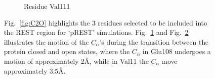 \begin{figure}[!ht]
\begin{subfigure}{.45\textwidth}
   \label{fig:Glu108-C2O}
\end{subfigure}\hfill
\begin{subfigure}{.55\textwidth}
   \centering
   \caption{Residue Val111}
   \label{fig:Val111-C2O}
\end{subfigure}\hfill
\caption{Fig.~\ref{fig:C2O} highlights the 3 residues selected to be included into the REST region for `pREST' simulations. 
Fig.~\ref{fig:Glu108-C2O} and Fig.~\ref{fig:Val111-C2O} illustrates the motion of the $C_{\alpha}$'s during the transition between the protein closed and open states, where the $C_{\alpha}$ in Glu108 undergoes a motion of approximately 2\AA, while in Val11 the $C_{\alpha}$ move approximately 3.5\AA.}
\label{fig:pRESTresidues}
\end{figure}

